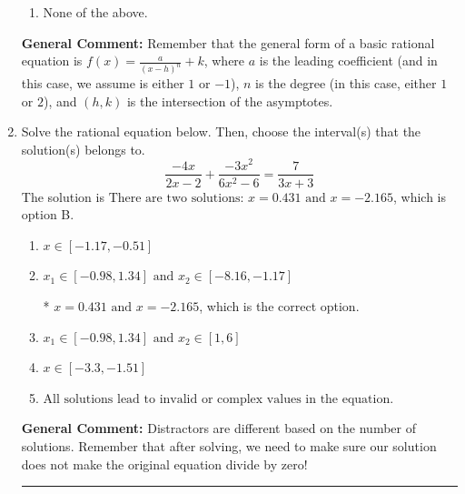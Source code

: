 \documentclass{extbook}[14pt]
\newcommand{\litem}[1]{\item #1

\rule{\textwidth}{0.4pt}}
\begin{document}
\begin{enumerate}
{\begin{enumerate}[label=\Alph*.]
\item None of the above.\end{enumerate}
\textbf{General Comment:} Remember that the general form of a basic rational equation is $ f(x) = \frac{a}{(x-h)^n} + k$, where $a$ is the leading coefficient (and in this case, we assume is either $1$ or $-1$), $n$ is the degree (in this case, either $1$ or $2$), and $(h, k)$ is the intersection of the asymptotes.
}
\litem{
Solve the rational equation below. Then, choose the interval(s) that the solution(s) belongs to.
\[ \frac{-4x}{2x -2} + \frac{-3x^{2}}{6x^{2} -6} = \frac{7}{3x + 3} \]The solution is \( \text{There are two solutions: } x = 0.431 \text{ and } x = -2.165 \), which is option B.\begin{enumerate}[label=\Alph*.]
\item \( x \in [-1.17,-0.51] \)


\item \( x_1 \in [-0.98, 1.34] \text{ and } x_2 \in [-8.16,-1.17] \)

* $x = 0.431 \text{ and } x = -2.165$, which is the correct option.
\item \( x_1 \in [-0.98, 1.34] \text{ and } x_2 \in [1,6] \)


\item \( x \in [-3.3,-1.51] \)


\item \( \text{All solutions lead to invalid or complex values in the equation.} \)


\end{enumerate}

\textbf{General Comment:} Distractors are different based on the number of solutions. Remember that after solving, we need to make sure our solution does not make the original equation divide by zero!
}
\end{enumerate}
\end{document}
